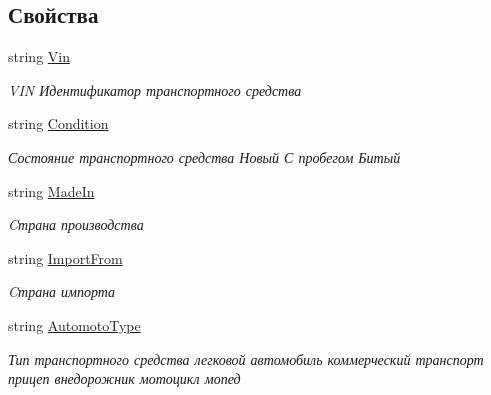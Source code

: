 \subsection*{Свойства}
\begin{DoxyCompactItemize}
\item 
string \hyperlink{class_r_t_1_1_parsing_libs_1_1_models_1_1_automoto_additional_info_ab8a38154ee0c905f87ecccbb7b6c3c4c}{Vin}
\begin{DoxyCompactList}\small\item\em V\+I\+N Идентификатор транспортного средства \end{DoxyCompactList}\item 
string \hyperlink{class_r_t_1_1_parsing_libs_1_1_models_1_1_automoto_additional_info_a5f82f085c75ae7193c8cfe34ec5f0ad5}{Condition}
\begin{DoxyCompactList}\small\item\em Состояние транспортного средства Новый С пробегом Битый \end{DoxyCompactList}\item 
string \hyperlink{class_r_t_1_1_parsing_libs_1_1_models_1_1_automoto_additional_info_a0281e2be102725f9ac47eef5eda2b525}{Made\+In}
\begin{DoxyCompactList}\small\item\em Cтрана производства \end{DoxyCompactList}\item 
string \hyperlink{class_r_t_1_1_parsing_libs_1_1_models_1_1_automoto_additional_info_aa54658bbd63cc8d87e93bff437a696a7}{Import\+From}
\begin{DoxyCompactList}\small\item\em Cтрана импорта \end{DoxyCompactList}\item 
string \hyperlink{class_r_t_1_1_parsing_libs_1_1_models_1_1_automoto_additional_info_a2a2f44c4b6e24fd64f2fda590f2debe0}{Automoto\+Type}
\begin{DoxyCompactList}\small\item\em Тип транспортного средства легковой автомобиль коммерческий транспорт прицеп внедорожник мотоцикл мопед \end{DoxyCompactList}\item 

\end{DoxyCompactItemize}
